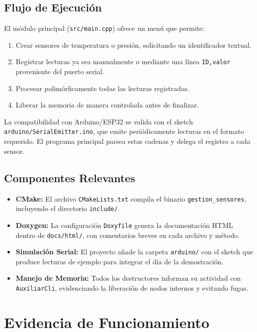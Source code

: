 \documentclass[11pt,a4paper]{article}
\begin{document}
\subsection{Flujo de Ejecución}

El módulo principal (\texttt{src/main.cpp}) ofrece un menú que permite:
\begin{enumerate}[leftmargin=1.5em]
    \item Crear sensores de temperatura o presión, solicitando un identificador textual.
    \item Registrar lecturas ya sea manualmente o mediante una línea \texttt{ID,valor} proveniente del puerto serial.
    \item Procesar polimórficamente todas las lecturas registradas.
    \item Liberar la memoria de manera controlada antes de finalizar.
\end{enumerate}

La compatibilidad con Arduino/ESP32 se valida con el sketch \texttt{arduino/SerialEmitter.ino}, que emite periódicamente lecturas en el formato requerido. El programa principal parsea estas cadenas y delega el registro a cada sensor.

\subsection{Componentes Relevantes}

\begin{itemize}[leftmargin=1.5em]
    \item \textbf{CMake:} El archivo \texttt{CMakeLists.txt} compila el binario \texttt{gestion\_sensores}, incluyendo el directorio \texttt{include/}.
    \item \textbf{Doxygen:} La configuración \texttt{Doxyfile} genera la documentación HTML dentro de \texttt{docs/html/}, con comentarios breves en cada archivo y método.
    \item \textbf{Simulación Serial:} El proyecto añade la carpeta \texttt{arduino/} con el sketch que produce lecturas de ejemplo para integrar el día de la demostración.
    \item \textbf{Manejo de Memoria:} Todos los destructores informan su actividad con \texttt{AuxiliarCli}, evidenciando la liberación de nodos internos y evitando fugas.
\end{itemize}

\section{Evidencia de Funcionamiento}
\end{document}
